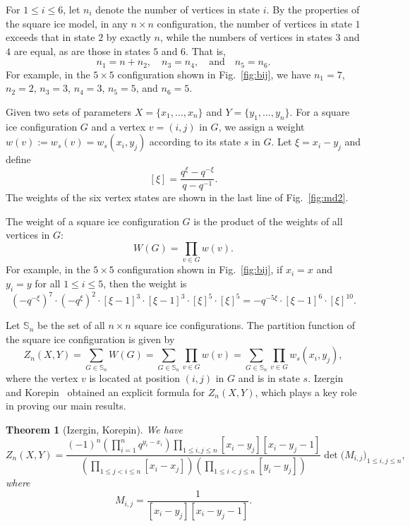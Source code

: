 \documentclass[12pt, a4paper]{amsart} %
\numberwithin{equation}{section}
\newtheorem{theorem}{Theorem}[section]
\begin{document}
For $ 1 \leq i \leq 6$, let $n_{i}$ denote the number of vertices in state $i$. 
By the properties of the square ice model, in any $n\times n$ configuration, the number of vertices in state $1$ exceeds that in state $2$ by exactly $n$, while the numbers of vertices in states $3$ and $4$ are equal, as are those in states $5$ and $6$. That is,
\begin{equation}\label{ni}
n_1 = n + n_2, \quad n_3 = n_4, \quad \text{and} \quad n_5 = n_6.
\end{equation}
For example, in the $5 \times 5$ configuration shown in Fig.~\ref{fig:bij}, we have $n_1=7$, $n_2=2$, $n_3=3$, $n_4=3$, $n_5=5$, and $n_6=5$.


Given two sets of  parameters $X=\{x_1,\dots,x_n\}$ and $Y=\{y_1,\dots,y_n\}$. 
For a square ice configuration $G$ and a vertex $v=(i,j)$ in $G$, 
we assign a weight $w(v):=w_s(v)=w_s(x_i,y_j)$ according to its state $s$ in $G$.  
Let $\xi = x_i - y_j$ and define 
$$
[\xi]=\frac{q^{\xi}-q^{-\xi}}{q-q^{-1}}.
$$
The weights of the six vertex states are shown in the last line of Fig.~\ref{fig:md2}. 

The weight of a square ice configuration $G$ is the product of the weights of all vertices in  $G$:
$$
W(G)=\prod_{v \in G}w(v).
$$
For example,  in the $5 \times 5$ configuration shown in Fig.~\ref{fig:bij},  if $x_i=x$ and $y_i=y$ for all $1\le i\le 5$, then the weight is
$$
(-q^{-\xi})^7\cdot(-q^\xi)^2\cdot[\xi-1]^3\cdot[\xi-1]^3\cdot[\xi]^5\cdot[\xi]^5=-q^{-5\xi}\cdot[\xi-1]^6\cdot[\xi]^{10}.
$$


Let $\mathbb{S}_n$ be the set of all $n\times n$ square ice configurations.  
The partition function of the square ice configuration is given by
\begin{equation}\label{def:Zn}
Z_n(X,Y)=\sum_{G \in \mathbb{S}_n} W(G)=\sum_{G \in \mathbb{S}_n} \prod_{v \in G}w(v)
=\sum_{G \in \mathbb{S}_n} \prod_{v \in G}w_s(x_i,y_j),
\end{equation}
where the vertex $v$ is located at position $(i,j)$ in $G$ and is in state $s$.
Izergin~\cite{Iz87} and Korepin~\cite{KBI93} obtained an explicit formula for $Z_n(X,Y)$,
  which plays a key role in proving our main results.

\begin{theorem}[Izergin, Korepin]\label{ikthv1} 
We have   
\begin{equation*}
        Z_n(X,Y)=\frac{(-1)^n(\prod_{i=1}^{n}q^{y_i-x_i})\prod_{1 \leq i,j\leq n}[x_i-y_j][x_i-y_j-1]}{(\prod_{1\leq j <i \leq n}[x_i-x_j])(\prod_{1 \leq i <j \leq n}[y_i-y_j])}\det{\bigl(M_{i,j}\bigr)_{1 \le i,j \le n}},
    \end{equation*}
    where
    $$M_{i,j}=\frac{1}{[x_i-y_j][x_i-y_j-1]}.$$
\end{theorem}
\end{document}
